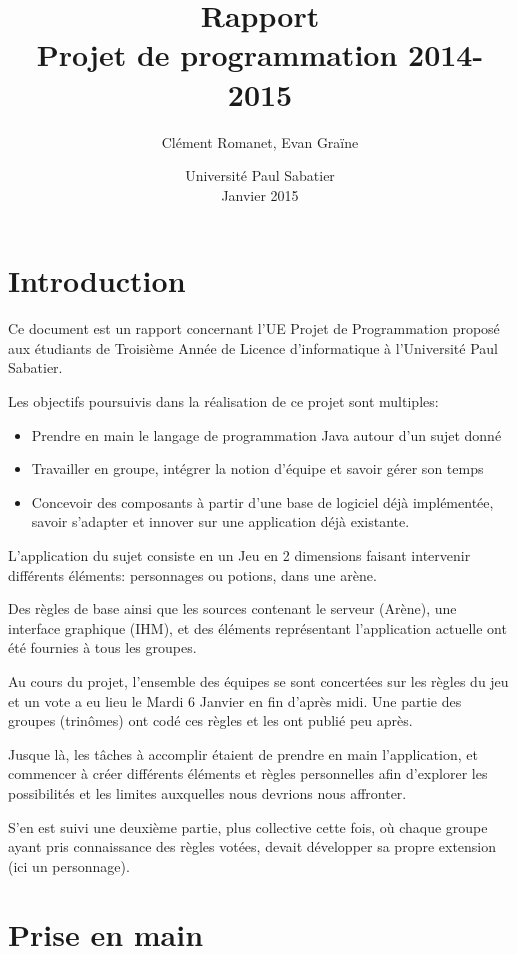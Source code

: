 \documentclass{article}
\title{Rapport\\Projet de programmation 2014-2015}
\author{Clément Romanet, Evan Graïne }
\date{Université Paul Sabatier\\Janvier 2015}
\begin{document}
\maketitle

\newpage
\part{Introduction}

Ce document est un rapport concernant l'UE Projet de Programmation proposé aux étudiants de Troisième Année de Licence d'informatique à l'Université Paul Sabatier.

Les objectifs poursuivis dans la réalisation de ce projet sont multiples: 
\begin{itemize}
  \item Prendre en main le langage de programmation Java autour d'un sujet donné
  \item Travailler en groupe, intégrer la notion d'équipe et savoir gérer son temps
  \item Concevoir des composants à partir d'une base de logiciel déjà implémentée, savoir s'adapter et innover sur une application déjà existante.
\end{itemize}

L'application du sujet consiste en un Jeu en 2 dimensions faisant intervenir différents éléments: personnages ou potions, dans une arène. 

Des règles de base ainsi que les sources contenant le serveur (Arène), une interface graphique (IHM), et des éléments représentant l'application actuelle ont été fournies à tous les groupes.

Au cours du projet, l'ensemble des équipes se sont concertées sur les règles du jeu et un vote a eu lieu le Mardi 6 Janvier en fin d'après midi. Une partie des groupes (trinômes) ont codé ces règles et les ont publié peu après.

Jusque là, les tâches à accomplir étaient de prendre en main l'application, et commencer à créer différents éléments et règles personnelles afin d'explorer les possibilités et les limites auxquelles nous devrions nous affronter. 

S'en est suivi une deuxième partie, plus collective cette fois, où chaque groupe ayant pris connaissance des règles votées, devait développer sa propre extension (ici un personnage).

\clearpage
\part{Prise en main}
\end{document}
